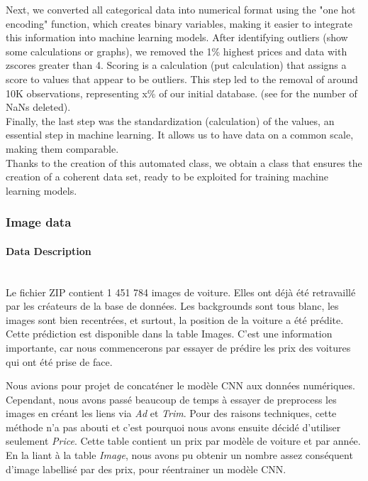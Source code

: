 \documentclass[12pt]{article}
\begin{document}
\noindent Next, we converted all categorical data into numerical format using the "one hot encoding" function, which creates binary variables, making it easier to integrate this information into machine learning models. After identifying outliers (show some calculations or graphs), we removed the 1\% highest prices and data with zscores greater than 4. Scoring is a calculation (put calculation) that assigns a score to values that appear to be outliers. This step led to the removal of around 10K observations, representing x\% of our initial database. (see for the number of NaNs deleted).\\

\noindent Finally, the last step was the standardization (calculation) of the values, an essential step in machine learning. It allows us to have data on a common scale, making them comparable. \\

\noindent Thanks to the creation of this automated class, we obtain a class that ensures the creation of a coherent data set, ready to be exploited for training machine learning models. \\


\subsubsection{Image data}
\paragraph{Data Description}
~~\\
\noindent Le fichier ZIP contient 1 451 784 images de voiture. Elles ont déjà été retravaillé par les créateurs de la base de données. Les backgrounds sont tous blanc, les images sont bien recentrées, et surtout, la position de la voiture a été prédite. Cette prédiction est disponible dans la table Images. C’est une information importante, car nous commencerons par essayer de prédire les prix des voitures qui ont été prise de face.

\noindent Nous avions pour projet de concaténer le modèle CNN aux données numériques. Cependant, nous avons passé beaucoup de temps à essayer de preprocess les images en créant les liens via \textit{Ad} et \textit{Trim}. Pour des raisons techniques, cette méthode n'a pas abouti et c'est pourquoi nous avons ensuite décidé d'utiliser seulement \textit{Price}. Cette table contient un prix par modèle de voiture et par année. En la liant à la table \textit{Image}, nous avons pu obtenir un nombre assez conséquent d'image labellisé par des prix, pour réentrainer un modèle CNN.
\end{document}
